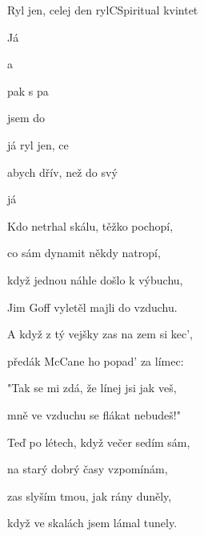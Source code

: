 \begin{song}{Ryl jen, celej den ryl}{C}{Spiritual kvintet}
\begin{SBVerse}
Já 

a 

pak s pa

jsem do
\end{SBVerse}
\begin{SBChorus}
  já ryl jen, ce

abych dřív, než do svý 

  

já 


\Ch{$|$:}{}     \Ch{:$|$}{}

\end{SBChorus}
\begin{SBVerse}
Kdo netrhal skálu, těžko pochopí,

co sám dynamit někdy natropí,

když jednou náhle došlo k výbuchu,

Jim Goff vyletěl majli do vzduchu.
\end{SBVerse}
\begin{SBVerse}
A když z tý vejšky zas na zem si kec',

předák McCane ho popad' za límec:

"Tak se mi zdá, že línej jsi jak veš,

mně ve vzduchu se flákat nebudeš!"
\end{SBVerse}
\begin{SBVerse}
Teď po létech, když večer sedím sám,

na starý dobrý časy vzpomínám,

zas slyším tmou, jak rány duněly,

když ve skalách jsem lámal tunely.
\end{SBVerse}
\end{song}

\pagebreak
